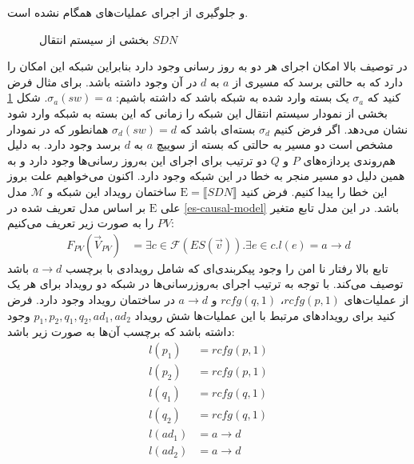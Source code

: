 \documentclass[
msc,
irfonts
]{./tex/tehran-thesis}
\newcommand{\پ}{پروژه/پایان‌نامه/رساله }
\theoremstyle{definition}
\theoremstyle{theorem}
\theoremstyle{definition}
\numberwithin{algorithm}{chapter}
\newcommand{\sem}[1]{\llbracket #1 \rrbracket}
\newcommand{\his}[1]{\langle #1 \rangle}
\newcommand{\ra}{\rightarrow}
\newcommand{\mc}[1]{\mathcal{#1}}
\newcommand{\mr}[1]{\mathrm{#1}}
\newcommand{\f}[1]{F_{#1}(\vec V_{#1})}
\begin{document}
و جلوگیری از اجرای عملیات‌های همگام نشده است.
\begin{figure}
    \centering
    \caption{
        بخشی از سیستم انتقال 
        $SDN$
    }
    \label{fig:blacklist:lts}
\end{figure}
در توصیف بالا امکان اجرای هر دو به روز رسانی وجود دارد
بنابراین شبکه این امکان را دارد که به حالتی برسد که مسیری از 
$a$
به
$d$
در آن وجود داشته باشد.
برای مثال فرض کنید که
$\sigma_a$
یک بسته وارد شده به شبکه باشد که داشته باشیم:
$\sigma_a(sw) = a$.
شکل
\ref{fig:blacklist:lts}
بخشی از نمودار سیستم انتقال این شبکه را زمانی که این بسته به شبکه وارد شود نشان می‌دهد.
اگر فرض کنیم
$\sigma_d$
بسته‌ای باشد که
$\sigma_d(sw) = d$
همانطور که در نمودار مشخص است دو مسیر به حالتی که بسته از سوییچ
$a$
به
$d$
برسد وجود دارد.
به دلیل هم‌روندی پردازه‌های
$P$
و
$Q$
دو ترتیب برای اجرای این به‌روز رسانی‌ها وجود دارد و به همین دلیل دو مسیر منجر به خطا در این شبکه وجود دارد.
اکنون می‌خواهیم علت بروز این خطا را پیدا کنیم.
فرض کنید
$\mr{E} = \sem{SDN}$
ساختمان رویداد این شبکه و
$\mc{M}$
مدل علی
$\mr{E}$
بر اساس مدل تعریف شده در
\ref{es-causal-model}
باشد.
در این مدل تابع متغیر
$PV$
را به صورت زیر تعریف می‌کنیم:
\begin{align*}
    \f{PV} & = \exists c \in \mc{F}(ES(\vec v)). \exists e \in c. l(e) = a\ra d
\end{align*}
تابع بالا رفتار نا امن را وجود پیکربندی‌ای که شامل رویدادی با برچسب 
$a \ra d$
باشد توصیف می‌کند.
با توجه به ترتیب اجرای به‌روز‌رسانی‌ها در شبکه دو رویداد برای هر یک از عملیات‌های
$rcfg(p,1)$،
$rcfg(q,1)$
و
$a \ra d$
در ساختمان رویداد وجود دارد.
فرض کنید برای رویداد‌های مرتبط با این عملیات‌ها شش رویداد
$p_1,p_2,q_1,q_2,ad_1,ad_2$
وجود داشته باشد که برچسب آن‌ها به صورت زیر باشد:
\begin{align*}
    l(p_1) & = rcfg(p,1) \\
    l(p_2) & = rcfg(p,1) \\
    l(q_1) & = rcfg(q,1) \\
    l(q_2) & = rcfg(q,1) \\
    l(ad_1) & = a \ra d \\
    l(ad_2) & = a \ra d 
\end{align*}
\end{document}
